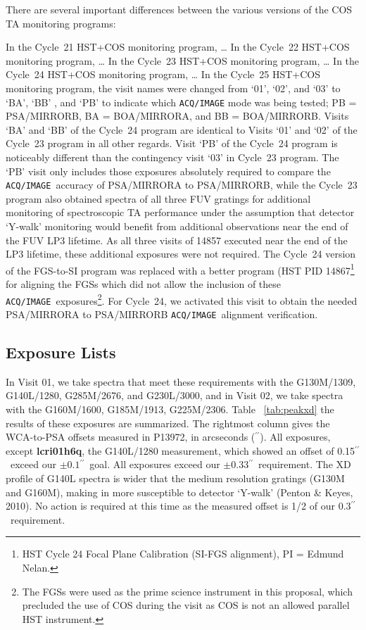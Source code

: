 \documentclass{stsci_report}
\def\arcsec{\hbox{$^{\prime\prime}$}}
\newcommand{\tacq}[1]{\texttt{ACQ/#1}}
\begin{document}
There are several important differences between the various versions of the COS TA monitoring programs:

In the Cycle~21 HST+COS monitoring program,  \dots
In the Cycle~22 HST+COS monitoring program,  \dots
In the Cycle~23 HST+COS monitoring program,  \dots
In the Cycle~24 HST+COS monitoring program,  \dots
In the Cycle~25 HST+COS monitoring program, the visit names were changed from `01', `02', and `03' to `BA', `BB' , and `PB' to indicate which \tacq{IMAGE} mode was being tested; PB = PSA/MIRRORB, BA = BOA/MIRRORA, and BB = BOA/MIRRORB. Visits `BA' and `BB' of the Cycle~24 program are identical to Visits `01' and `02' of the Cycle~23 program in all other regards.
Visit `PB' of the Cycle~24 program is noticeably different than the contingency visit `03' in Cycle~23 program. The `PB' visit only includes those exposures absolutely required to compare the \tacq{IMAGE}~accuracy of PSA/MIRRORA to PSA/MIRRORB, while the Cycle~23 program also obtained spectra of all three FUV gratings for additional monitoring of spectroscopic TA performance under the assumption that detector `Y-walk' monitoring would benefit from additional observations near the end of the FUV LP3 lifetime. As all three visits of 14857 executed near the end of the LP3 lifetime, these additional exposures were not required.
The Cycle~24 version of the FGS-to-SI program was replaced with a better program (HST PID 14867\footnote{HST Cycle 24 Focal Plane Calibration (SI-FGS alignment), PI = Edmund Nelan.} for aligning the FGSs which did not allow the inclusion of these \tacq{IMAGE}~exposures\footnote{The FGSs were used as the prime science instrument in this proposal, which precluded the use of COS during the visit as COS is not an allowed parallel HST instrument.}.
For Cycle~24, we activated this visit to obtain the needed PSA/MIRRORA to PSA/MIRRORB \tacq{IMAGE}~alignment verification.

\clearpage

\subsection{Exposure Lists}\label{subsec:elists}

In Visit 01, we take spectra that meet these requirements with the G130M/1309, G140L/1280, G285M/2676, and G230L/3000, and in Visit 02,
we take spectra with the G160M/1600, G185M/1913, G225M/2306. Table ~\ref{tab:peakxd} the results of these exposures are summarized.
The rightmost column gives the WCA-to-PSA offsets measured in P13972, in arcseconds (\arcsec).
All exposures, except {\bf lcri01h6q}, the G140L/1280 measurement, which showed an offset of 0.15\arcsec\ exceed our $\pm 0.1$\arcsec\ goal.
All exposures exceed our $\pm 0.33$\arcsec\ requirement. The XD profile of G140L spectra is wider that the medium
resolution gratings (G130M and G160M), making in more susceptible to detector `Y-walk' (Penton \& Keyes, 2010).
No action is required at this time as the measured offset is 1/2 of our 0.3\arcsec\ requirement.
\end{document}
